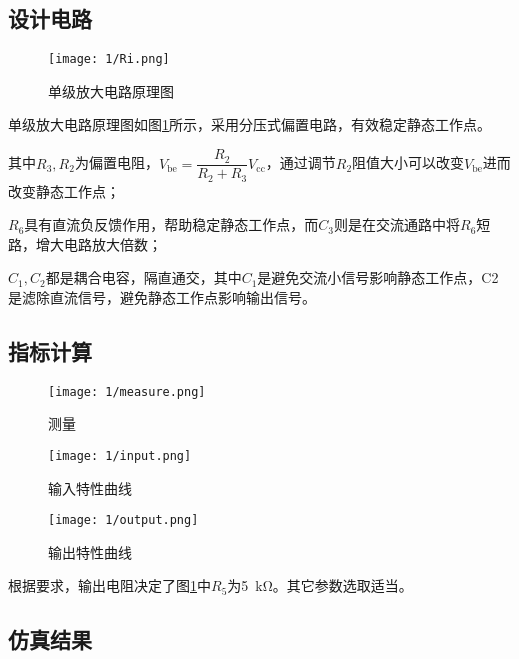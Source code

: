 \subsection{设计电路}%
\label{sub:\arabic{chapter}设计电路}

\begin{figure}[H]
	\centering
	\texttt{[image: 1/Ri.png]}
	\caption{单级放大电路原理图}
	\label{fig:单级放大电路原理图}
\end{figure}

单级放大电路原理图如图\ref{fig:单级放大电路原理图}所示，采用分压式偏置电路，有效稳定静态工作点。

其中$ R_3, R_2 $为偏置电阻，$ V_\mathrm{be} = \dfrac{R_2}{R_2 + R_3} V_\mathrm{cc} $，通过调节$ R_2 $阻值大小可以改变$ V_\mathrm{be} $进而改变静态工作点；

$ R_6 $具有直流负反馈作用，帮助稳定静态工作点，而$ C_3 $则是在交流通路中将$ R_6 $短路，增大电路放大倍数；

$ C_1, C_2 $都是耦合电容，隔直通交，其中$ C_1 $是避免交流小信号影响静态工作点，C2是滤除直流信号，避免静态工作点影响输出信号。

\subsection{指标计算}%
\label{sub:\arabic{chapter}指标计算}

\begin{figure}[H]
	\centering
	\texttt{[image: 1/measure.png]}
	\caption{测量}
	\label{fig:测量}
\end{figure}

\begin{figure}[H]
	\centering
	\texttt{[image: 1/input.png]}
	\caption{输入特性曲线}
	\label{fig:输入特性曲线}
\end{figure}

\begin{figure}[H]
	\centering
	\texttt{[image: 1/output.png]}
	\caption{输出特性曲线}
	\label{fig:输出特性曲线}
\end{figure}

根据要求，输出电阻决定了图\ref{fig:单级放大电路原理图}中$ R_5 $为\SI{5}{\kohm}。其它参数选取适当。

\subsection{仿真结果}%
\label{sub:\arabic{chapter}仿真结果}

